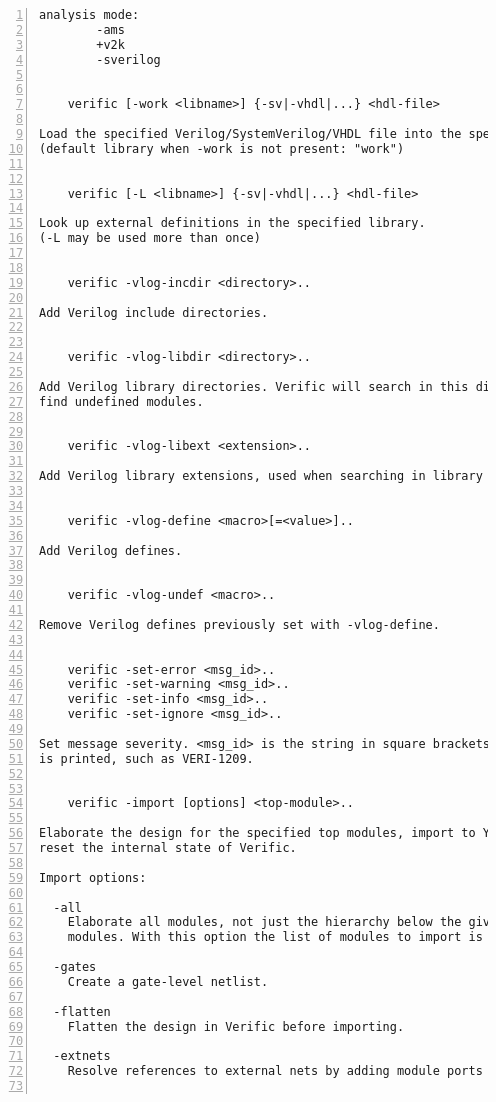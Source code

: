 \begin{lstlisting}[numbers=left,frame=single]
    analysis mode:
        -ams
        +v2k
        -sverilog


    verific [-work <libname>] {-sv|-vhdl|...} <hdl-file>

Load the specified Verilog/SystemVerilog/VHDL file into the specified library.
(default library when -work is not present: "work")


    verific [-L <libname>] {-sv|-vhdl|...} <hdl-file>

Look up external definitions in the specified library.
(-L may be used more than once)


    verific -vlog-incdir <directory>..

Add Verilog include directories.


    verific -vlog-libdir <directory>..

Add Verilog library directories. Verific will search in this directories to
find undefined modules.


    verific -vlog-libext <extension>..

Add Verilog library extensions, used when searching in library directories.


    verific -vlog-define <macro>[=<value>]..

Add Verilog defines.


    verific -vlog-undef <macro>..

Remove Verilog defines previously set with -vlog-define.


    verific -set-error <msg_id>..
    verific -set-warning <msg_id>..
    verific -set-info <msg_id>..
    verific -set-ignore <msg_id>..

Set message severity. <msg_id> is the string in square brackets when a message
is printed, such as VERI-1209.


    verific -import [options] <top-module>..

Elaborate the design for the specified top modules, import to Yosys and
reset the internal state of Verific.

Import options:

  -all
    Elaborate all modules, not just the hierarchy below the given top
    modules. With this option the list of modules to import is optional.

  -gates
    Create a gate-level netlist.

  -flatten
    Flatten the design in Verific before importing.

  -extnets
    Resolve references to external nets by adding module ports as needed.


\end{lstlisting}
